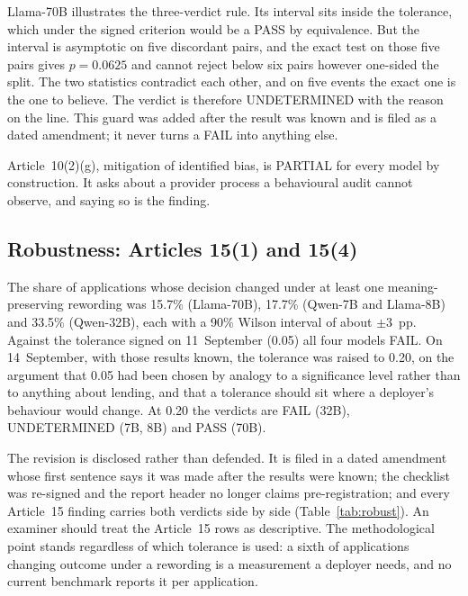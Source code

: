\documentclass[11pt,a4paper]{article}
\begin{document}
Llama-70B illustrates the three-verdict rule. Its interval sits inside the
tolerance, which under the signed criterion would be a PASS by equivalence.
But the interval is asymptotic on five discordant pairs, and the exact test
on those five pairs gives $p = 0.0625$ and cannot reject below six pairs
however one-sided the split. The two statistics contradict each other, and
on five events the exact one is the one to believe. The verdict is therefore
UNDETERMINED with the reason on the line. This guard was added after the
result was known and is filed as a dated amendment; it never turns a FAIL
into anything else.

Article~10(2)(g), mitigation of identified bias, is PARTIAL for every model
by construction. It asks about a provider process a behavioural audit cannot
observe, and saying so is the finding.

\subsection{Robustness: Articles 15(1) and 15(4)}

The share of applications whose decision changed under at least one
meaning-preserving rewording was 15.7\% (Llama-70B), 17.7\% (Qwen-7B and
Llama-8B) and 33.5\% (Qwen-32B), each with a 90\% Wilson interval of about
$\pm3$~pp. Against the tolerance signed on 11~September (0.05) all four
models FAIL. On 14~September, with those results known, the tolerance was
raised to 0.20, on the argument that 0.05 had been chosen by analogy to a
significance level rather than to anything about lending, and that a
tolerance should sit where a deployer's behaviour would change. At 0.20 the
verdicts are FAIL (32B), UNDETERMINED (7B, 8B) and PASS (70B).

The revision is disclosed rather than defended. It is filed in a dated
amendment whose first sentence says it was made after the results were
known; the checklist was re-signed and the report header no longer claims
pre-registration; and every Article~15 finding carries both verdicts side by
side (Table~\ref{tab:robust}). An examiner should treat the Article~15 rows
as descriptive. The methodological point stands regardless of which
tolerance is used: a sixth of applications changing outcome under a
rewording is a measurement a deployer needs, and no current benchmark
reports it per application.
\end{document}
